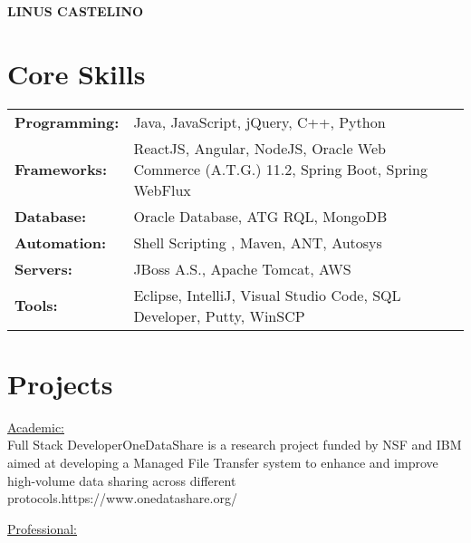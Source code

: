 \documentclass[letter]{twentysecondcv}
\begin{document}
{\fontsize{28pt}{12pt}\selectfont\color{mainblue}\textbf{LINUS CASTELINO}} \\

\fontsize{10.5pt}{10pt}
\makeprofile %

\section{Core Skills}

\begin{tabular}{p{2.5cm}p{10.5cm}}
    \textbf{Programming:} & {Java, JavaScript, jQuery, C++, Python}\\
    \textbf{Frameworks:} & {ReactJS, Angular, NodeJS, Oracle Web Commerce (A.T.G.) 11.2, Spring Boot, Spring WebFlux}\\ 
    \textbf{Database:} & {Oracle Database, ATG RQL, MongoDB}\\
    \textbf{Automation:} & {Shell Scripting , Maven, ANT, Autosys}\\
    \textbf{Servers:} & {JBoss A.S., Apache Tomcat, AWS}\\
    \textbf{Tools:} & {Eclipse, IntelliJ, Visual Studio Code, SQL Developer, Putty, WinSCP}
    \vspace{5mm}
\end{tabular}

\section{Projects}

\begin{twenty} 
    \underline{Academic:}\\
     {Full Stack Developer}{OneDataShare is a research project funded by NSF and IBM aimed at developing a Managed File Transfer system to enhance and improve high-volume data sharing across different protocols.}{https://www.onedatashare.org/}
    
    
    \underline{Professional:}\\
\end{twenty}
\end{document}

